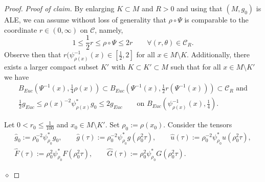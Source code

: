 \documentclass[12pt]{amsart}
\renewcommand{\1}{{\mathbf 1}}
\newcommand{\dist}{{\operatorname{dist}}}
\newenvironment{claimproof}{\par\noindent\textit{Proof of claim.}\space}{\hfill$\diamond$\medskip\par}
\theoremstyle{others}
\numberwithin{equation}{section}
\begin{document}
\begin{proof}
\begin{claimproof}
        By enlarging $K \subset M$ and $R > 0$ and using that $(M, g_0)$ is ALE, we can assume without loss of generality that $\rho \circ \Psi$ is comparable to the coordinate $r \in (0, \infty)$ on $\mathcal C$, namely,
        \begin{equation} \label{proof parab smoothing in weighted Holder, eqn 3.0}
            1 \le \frac12 r \le \rho \circ \Psi \le 2 r \qquad \forall (r, \theta) \in \mathcal C_R.
        \end{equation}
        Observe then that $r ( \psi_{\rho(x)}^{-1}(x) \in [\frac 12, 2]$ for all $x \in M \setminus K$.
        Additionally, there exists a larger compact subset $K'$ with $K \subset K' \subset M$ such that for all $x \in M \setminus K'$ we have
        \begin{gather}
            \label{proof parab smoothing in weighted Holder, eqn 3.15}
            B_{Euc}\left( \Psi^{-1} (x) , \frac14 \rho(x) \right) \subset B_{Euc} \left( \Psi^{-1} (x) , \frac 12 r( \Psi^{-1} (x) ) \right) \subset \mathcal C_R  \text{ and}\\
             \label{proof parab smoothing in weighted Holder, eqn 3.2}
            \frac12 g_{Euc} \le \rho(x)^{-2} \psi_{\rho(x)}^* g_0 \le 2 g_{Euc} \qquad \text{on } B_{Euc}\left(\psi_{\rho(x)}^{-1} (x) , \frac14 \right).%
        \end{gather}
        
        Let $0 < r_0 \le \frac1{100}$ and $x_0 \in M \setminus K'$.
        Set $\rho_0 :=\rho(x_0) $.
        Consider the tensors
        \begin{gather*}
            \hat g_0 := \rho_0^{-2} \psi_{\rho_0}^*  g_0 , \qquad  
            \hat g(\tau) := \rho_0^{-2} \psi_{\rho_0}^*  g(\rho_0^2 \tau) , \qquad  
            \hat u(\tau) := \rho_0^{-2} \psi_{\rho_0}^* u ( \rho_0^2 \tau), \\ 
            \hat F(\tau) := \rho_0^2 \psi_{\rho_0}^* F(\rho_0^2 \tau) , \qquad 
            \hat G (\tau):= \rho_0^2 \psi_{\rho_0}^* G (\rho_0^2 \tau).
        \end{gather*}
            

\end{claimproof}
\end{proof}
\end{document}
